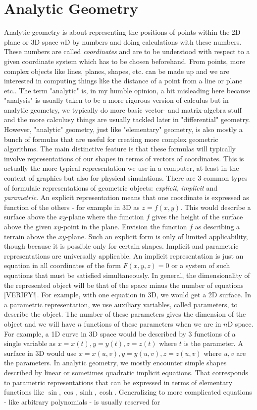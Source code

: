 \section{Analytic Geometry}
Analytic geometry is about representing the positions of points within the 2D plane or 3D space $n$D by numbers and doing calculations with these numbers. These numbers are called \emph{coordinates} and are to be understood with respect to a given coordinate system which has to be chosen beforehand. From points, more complex objects like lines, planes, shapes, etc. can be made up and we are interested in computing things like the distance of a point from a line or plane etc.. The term "analytic" is, in my humble opinion, a bit misleading here because "analysis" is usually taken to be a more rigorous version of calculus but in analytic geometry, we typically do more basic vector- and matrix-algebra stuff and the more calculusy things are usually tackled later in "differential" geometry. However, "analytic" geometry, just like "elementary" geometry, is also mostly a bunch of formulas that are useful for creating more complex geometric algorithms. The main distinctive feature is that these formulas will typically involve representations of our shapes in terms of vectors of coordinates. This is actually the more typical representation we use in a computer, at least in the context of graphics but also for physical simulations. There are 3 common types of formulaic representations of geometric objects: \emph{explicit}, \emph{implicit} and \emph{parametric}. An explicit representation means that one coordinate is expressed as function of the others - for example in 3D as $z = f(x,y)$. This would describe a surface above the $xy$-plane where the function $f$ gives the height of the surface above the given $xy$-point in the plane. Envision the function $f$ as describing a terrain above the $xy$-plane. Such an explicit form is only of limited applicability, though because it is possible only for certain shapes. Implicit and parametric representations are universally applicable. An implicit representation is just an equation in all coordinates of the form $F(x,y,z) = 0$ or a system of such equations that must be satisfied simultaneously. In general, the dimensionality of the represented object will be that of the space minus the number of equations [VERIFY!]. For example, with one equation in 3D, we would get a 2D surface. In a parametric representation, we use auxiliary variables, called parameters, to describe the object. The number of these parameters gives the dimension of the object and we will have $n$ functions of these parameters when we are in $n$D space. For example, a 1D curve in 3D space would be described by 3 functions of a single variable as $x = x(t), y = y(t), z = z(t)$ where $t$ is the parameter. A surface in 3D would use $x = x(u,v), y = y(u,v), z = z(u,v)$ where $u,v$ are the parameters. In analytic geometry, we mostly encounter simple shapes described by linear or sometimes quadratic implicit equations. That corresponds to parametric representations that can be expressed in terms of elementary functions like $\sin, \cos, \sinh, \cosh$. Generalizing to more complicated equations - like arbitrary polynomials - is usually reserved for 